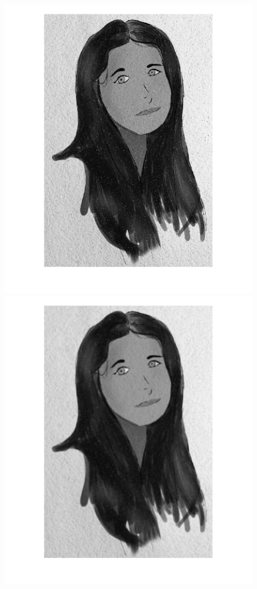 \begin{figure}[htb] \centering
\includegraphics[scale=0.15,trim={0cm 3cm 3cm 0cm},clip]{Pictures/Esempi di utilizzo/Esempio 5/ami_originale_resize.png}
\includegraphics[scale=0.15,trim={3cm 3cm 0cm 0cm},clip]{Pictures/Esempi di utilizzo/Esempio 5/ami_filtrata_sigma0_5_kappa60_resize.png}

\end{figure}
